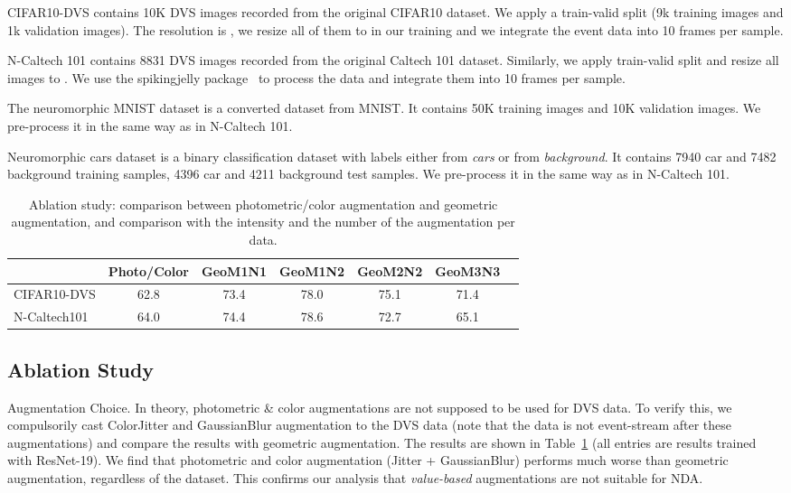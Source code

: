 \documentclass[runningheads]{llncs}
\newcommand{\bftab}{\fontseries{b}\selectfont}
\begin{document}
\noindent{\bftab CIFAR10-DVS~\cite{li2017cifar10}.} CIFAR10-DVS contains 10K DVS images recorded from the original CIFAR10 dataset. We apply a  train-valid split (\ie 9k training images and 1k validation images). The resolution is , we resize all of them to  in our training and we integrate the event data into 10 frames per sample. 

\noindent{\bftab N-Caltech 101~\cite{orchard2015converting}.} N-Caltech 101 contains 8831 DVS images recorded from the original Caltech 101 dataset. Similarly, we apply  train-valid split and resize all images to . We use the spikingjelly package~\cite{SpikingJelly} to process the data and integrate them into 10 frames per sample. 

\noindent{\bftab N-MNIST~\cite{orchard2015converting}.}
The neuromorphic MNIST dataset is a converted dataset from MNIST. It contains 50K training images and 10K validation images. We pre-process it in the same way as in N-Caltech 101.

\noindent{\bftab N-Cars~\cite{sironi2018hats}.}
Neuromorphic cars dataset is a binary classification dataset with labels either from \textit{cars} or from \textit{background}. It contains 7940 car and 7482 background training samples, 4396 car and 4211 background test samples. We pre-process it in the same way as in N-Caltech 101.



\begin{table}[t]
   \caption{Ablation study: comparison between photometric/color augmentation and geometric augmentation, and comparison with the intensity and the number of the augmentation per data.}
   \centering
   \begin{adjustbox}{max width=\linewidth}
    \begin{tabular}{lcccccc}
       \toprule
\bftab{Dataset} & {Photo/Color} & {GeoM1N1} & {GeoM1N2} & {GeoM2N2} & {GeoM3N3} \\
    \midrule
    CIFAR10-DVS  & 62.8 & 73.4 & 78.0 & 75.1 & 71.4 \\
    N-Caltech101  &  64.0 & 74.4 & 78.6 & 72.7 & 65.1 \\
   \bottomrule
   \end{tabular}
   \end{adjustbox}
\label{tab_ablation}
\end{table}

\subsection{Ablation Study}
\label{sec_ablation}
{\bftab Augmentation Choice.}
In theory, photometric \& color augmentations are not supposed to be used for DVS data. To verify this, we {\bftab compulsorily cast ColorJitter and GaussianBlur augmentation to the DVS data} (note that the data is not event-stream after these augmentations) and compare the results with geometric augmentation. The results are shown in Table~\ref{tab_ablation} (all entries are results trained with ResNet-19). We find that photometric and color augmentation (Jitter + GaussianBlur) performs much worse than geometric augmentation, regardless of the dataset. This confirms our analysis that \textit{value-based} augmentations are not suitable for NDA. 
\end{document}
